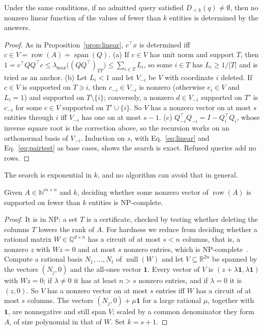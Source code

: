 \documentclass[sigconf,nonacm]{acmart}
\begin{document}
\begin{proposition}\label{prop:pair}
Under the same conditions, if no admitted query satisfied $D_{<k}(q)\ne\emptyset$, then no nonzero linear function of the values of fewer than $k$ entities is determined by the answers.
\end{proposition}
\begin{proof}
As in Proposition~\ref{prop:linear}, $c^{\top}x$ is determined iff $c\in V=\operatorname{row}(A)=\operatorname{span}(Q)$. (a) If $c\in V$ has unit norm and support $T$, then $1=c^{\top}QQ^{\top}c\le\lambda_{\max}\bigl((QQ^{\top})_{TT}\bigr)\le\sum_{i\in T}L_i$, so some $i\in T$ has $L_i\ge1/|T|$ and is tried as an anchor. (b) Let $L_i<1$ and let $V_{-i}$ be $V$ with coordinate $i$ deleted. If $c\in V$ is supported on $T\ni i$, then $c_{-i}\in V_{-i}$ is nonzero (otherwise $e_i\in V$ and $L_i=1$) and supported on $T\setminus\{i\}$; conversely, a nonzero $d\in V_{-i}$ supported on $T'$ is $c_{-i}$ for some $c\in V$ supported on $T'\cup\{i\}$. So $V$ has a nonzero vector on at most $s$ entities through $i$ iff $V_{-i}$ has one on at most $s-1$. (c) $Q_{-i}^{\top}Q_{-i}=I-Q_i^{\top}Q_i$, whose inverse square root is the correction above, so the recursion works on an orthonormal basis of $V_{-i}$. Induction on $s$, with Eq.~\ref{eq:linear} and Eq.~\ref{eq:pairtest} as base cases, shows the search is exact. Refused queries add no rows.
\end{proof}

The search is exponential in $k$, and no algorithm can avoid that in general.

\begin{theorem}\label{thm:hard}
Given $A\in\mathbb{N}^{m\times n}$ and $k$, deciding whether some nonzero vector of $\operatorname{row}(A)$ is supported on fewer than $k$ entities is NP-complete.
\end{theorem}
\begin{proof}
It is in NP: a set $T$ is a certificate, checked by testing whether deleting the columns $T$ lowers the rank of $A$. For hardness we reduce from deciding whether a rational matrix $W\in\mathbb{Q}^{d\times n}$ has a circuit of at most $s<n$ columns, that is, a nonzero $z$ with $Wz=0$ and at most $s$ nonzero entries, which is NP-complete~\cite[Thm.~1]{tillmann2014complexity}. Compute a rational basis $N_1,\dots,N_t$ of $\operatorname{null}(W)$ and let $V\subseteq\mathbb{R}^{2n}$ be spanned by the vectors $(N_j,0)$ and the all-ones vector $\mathbf{1}$. Every vector of $V$ is $(z+\lambda\mathbf{1},\lambda\mathbf{1})$ with $Wz=0$; if $\lambda\ne0$ it has at least $n>s$ nonzero entries, and if $\lambda=0$ it is $(z,0)$. So $V$ has a nonzero vector on at most $s$ entries iff $W$ has a circuit of at most $s$ columns. The vectors $(N_j,0)+\mu\mathbf{1}$ for a large rational $\mu$, together with $\mathbf{1}$, are nonnegative and still span $V$; scaled by a common denominator they form $A$, of size polynomial in that of $W$. Set $k=s+1$.
\end{proof}
\end{document}
